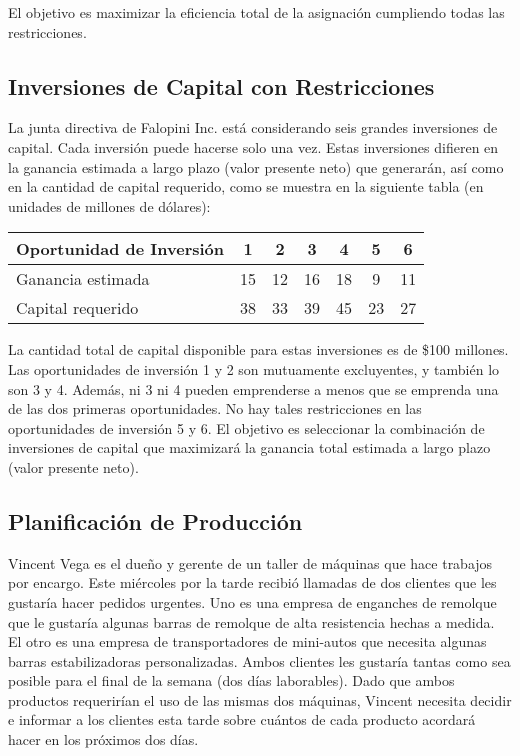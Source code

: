 \documentclass[12pt]{article}
\begin{document}
El objetivo es maximizar la eficiencia total de la asignación cumpliendo todas las restricciones.

\subsection{Inversiones de Capital con Restricciones}
La junta directiva de Falopini Inc. está considerando seis grandes inversiones de capital. Cada inversión puede hacerse solo una vez. Estas inversiones difieren en la ganancia estimada a largo plazo (valor presente neto) que generarán, así como en la cantidad de capital requerido, como se muestra en la siguiente tabla (en unidades de millones de dólares):

\begin{table}[H]
\centering
\begin{tabular}{lcccccc}
\toprule
\textbf{Oportunidad de Inversión} & 1 & 2 & 3 & 4 & 5 & 6 \\
\midrule
Ganancia estimada & 15 & 12 & 16 & 18 & 9 & 11 \\
Capital requerido & 38 & 33 & 39 & 45 & 23 & 27 \\
\bottomrule
\end{tabular}
\end{table}

La cantidad total de capital disponible para estas inversiones es de \$100 millones. Las oportunidades de inversión 1 y 2 son mutuamente excluyentes, y también lo son 3 y 4. Además, ni 3 ni 4 pueden emprenderse a menos que se emprenda una de las dos primeras oportunidades. No hay tales restricciones en las oportunidades de inversión 5 y 6. El objetivo es seleccionar la combinación de inversiones de capital que maximizará la ganancia total estimada a largo plazo (valor presente neto).

\subsection{Planificación de Producción}
Vincent Vega es el dueño y gerente de un taller de máquinas que hace trabajos por encargo. Este miércoles por la tarde recibió llamadas de dos clientes que les gustaría hacer pedidos urgentes. Uno es una empresa de enganches de remolque que le gustaría algunas barras de remolque de alta resistencia hechas a medida. El otro es una empresa de transportadores de mini-autos que necesita algunas barras estabilizadoras personalizadas. Ambos clientes les gustaría tantas como sea posible para el final de la semana (dos días laborables). Dado que ambos productos requerirían el uso de las mismas dos máquinas, Vincent necesita decidir e informar a los clientes esta tarde sobre cuántos de cada producto acordará hacer en los próximos dos días.
\end{document}
